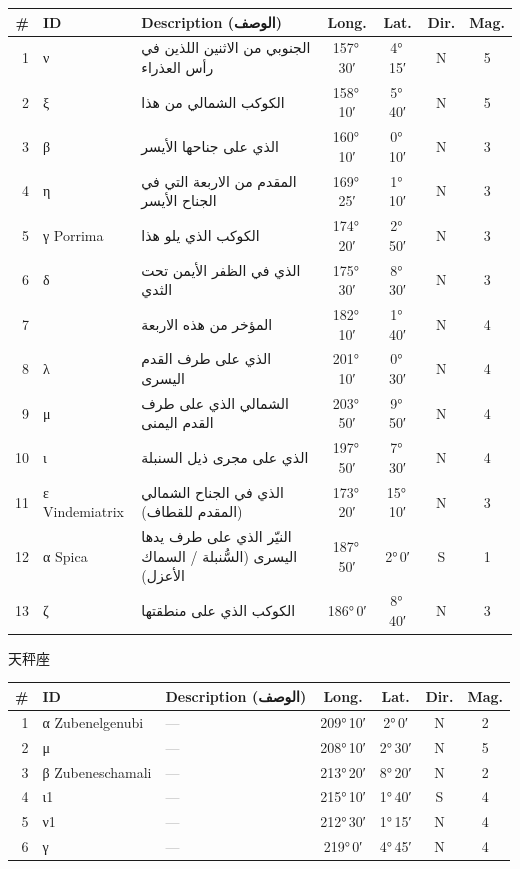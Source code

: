 \documentclass[9pt,a4paper]{extarticle}
\newcommand{\ar}[1]{{\arabicfont\textarabic{#1}}}
\begin{document}
\begin{longtable}{r l >{\raggedright\arraybackslash}p{6.7cm} c c c c}
\toprule \# & ID & Description (\ar{الوصف}) & Long. & Lat. & Dir. & Mag.\\ \midrule\endhead
1 & ν & \ar{الجنوبي من الاثنين اللذين في رأس العذراء} & 157°\,30′ & 4°\,15′ & N & 5\\
2 & ξ & \ar{الكوكب الشمالي من هذا} & 158°\,10′ & 5°\,40′ & N & 5\\
3 & β & \ar{الذي على جناحها الأيسر} & 160°\,10′ & 0°\,10′ & N & 3\\
4 & η & \ar{المقدم من الاربعة التي في الجناح الأيسر} & 169°\,25′ & 1°\,10′ & N & 3\\
5 & γ Porrima & \ar{الكوكب الذي يلو هذا} & 174°\,20′ & 2°\,50′ & N & 3\\
6 & δ & \ar{الذي في الظفر الأيمن تحت الثدي} & 175°\,30′ & 8°\,30′ & N & 3\\
7 &  & \ar{المؤخر من هذه الاربعة} & 182°\,10′ & 1°\,40′ & N & 4\\
8 & λ & \ar{الذي على طرف القدم اليسرى} & 201°\,10′ & 0°\,30′ & N & 4\\
9 & μ & \ar{الشمالي الذي على طرف القدم اليمنى} & 203°\,50′ & 9°\,50′ & N & 4\\
10 & ι & \ar{الذي على مجرى ذيل السنبلة} & 197°\,50′ & 7°\,30′ & N & 4\\
11 & ε Vindemiatrix & \ar{الذي في الجناح الشمالي (المقدم للقطاف)} & 173°\,20′ & 15°\,10′ & N & 3\\
12 & α Spica & \ar{النيّر الذي على طرف يدها اليسرى (السُّنبلة / السماك الأعزل)} & 187°\,50′ & 2°\,0′ & S & 1\\
13 & ζ & \ar{الكوكب الذي على منطقتها} & 186°\,0′ & 8°\,40′ & N & 3\\
\bottomrule\end{longtable}
\vspace{4pt}\quad\ar{الميزان}\quad 天秤座
\begin{longtable}{r l >{\raggedright\arraybackslash}p{6.7cm} c c c c}
\toprule \# & ID & Description (\ar{الوصف}) & Long. & Lat. & Dir. & Mag.\\ \midrule\endhead
1 & α Zubenelgenubi & \textcolor{gray}{—} & 209°\,10′ & 2°\,0′ & N & 2\\
2 & μ & \textcolor{gray}{—} & 208°\,10′ & 2°\,30′ & N & 5\\
3 & β Zubeneschamali & \textcolor{gray}{—} & 213°\,20′ & 8°\,20′ & N & 2\\
4 & ι1 & \textcolor{gray}{—} & 215°\,10′ & 1°\,40′ & S & 4\\
5 & ν1 & \textcolor{gray}{—} & 212°\,30′ & 1°\,15′ & N & 4\\
6 & γ & \textcolor{gray}{—} & 219°\,0′ & 4°\,45′ & N & 4\\
\bottomrule\end{longtable}
\end{document}

